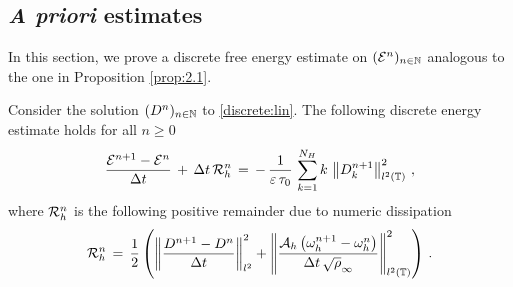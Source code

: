 \documentclass[11pt]{amsart}
\numberwithin{equation}{section}
\numberwithin{figure}{section}
\begin{document}
\subsection{{\it A priori} estimates}
In this section, we prove a discrete free energy
estimate on $({\mathcal E}^n)_{n\in{\mathbb N}}$ analogous to the one in Proposition \ref{prop:2.1}. 
\begin{proposition}
  \label{energy:estimate}
Consider the solution $(D^n)_{n\in{\mathbb N}}$ to \eqref{discrete:lin}. The following discrete energy estimate holds for all $n\geq0$
\[
\frac{{\mathcal E}^{n+1}
	-{\mathcal E}^{n}}{\Delta t}
\,+\,
\Delta t\,{\mathcal R}_h^n\,=
\,-\,\frac{1}{\varepsilon\, \tau_0}\,\sum_{k=1}^{N_H} k\,\left\|D^{n+1}_k\right\|^2_{l^2\left({\mathbb T}\right)}\,,
\]
where ${\mathcal R}_h^n$ is the following positive remainder due to numeric dissipation
\[
{\mathcal R}_h^n\,=\,
\frac{1}{2}
\left(
\left\|
\frac{D^{n+1}-D^{n}}{\Delta t}
\right\|^2_{l^2}
+
\left\|
\frac{{\mathcal A}_h\left(\omega_h^{n+1}-\omega_h^{n}\right)}{\Delta t\,\sqrt{\rho}_{\infty}}
\right\|^2_{l^2\left({\mathbb T}\right)}
\right)\,.
\]
\end{proposition}
\end{document}
